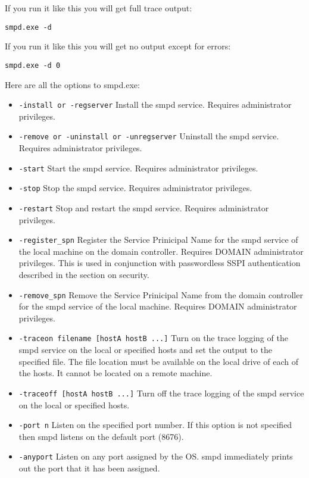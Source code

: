 \documentclass[dvipdfm,11pt]{article}
\begin{document}
If you run it like this you will get full trace output:
\begin{verbatim}
smpd.exe -d
\end{verbatim}

If you run it like this you will get no output except for errors:
\begin{verbatim}
smpd.exe -d 0
\end{verbatim}

Here are all the options to smpd.exe:
\begin{itemize}
\item \texttt{-install or -regserver}
Install the smpd service.  Requires administrator privileges.
\item \texttt{-remove or -uninstall or -unregserver}
Uninstall the smpd service.  Requires administrator privileges.
\item \texttt{-start}
Start the smpd service.  Requires administrator privileges.
\item \texttt{-stop}
Stop the smpd service.  Requires administrator privileges.
\item \texttt{-restart}
Stop and restart the smpd service.  Requires administrator privileges.
\item \texttt{-register\_spn}
Register the Service Prinicipal Name for the smpd service of the local machine
on the domain controller.  Requires DOMAIN administrator privileges.  This is
used in conjunction with passwordless SSPI authentication described in the
section on security.
\item \texttt{-remove\_spn}
Remove the Service Prinicipal Name from the domain controller for the smpd service
of the local machine.  Requires DOMAIN administrator privileges.
\item \texttt{-traceon filename [hostA hostB ...]}
Turn on the trace logging of the smpd service on the local or specified hosts
and set the output to the specified file.  The file location must be available
on the local drive of each of the hosts.  It cannot be located on a remote 
machine.
\item \texttt{-traceoff [hostA hostB ...]}
Turn off the trace logging of the smpd service on the local or specified hosts.
\item \texttt{-port n}
Listen on the specified port number.  If this option is not specified then smpd
listens on the default port (8676).
\item \texttt{-anyport}
Listen on any port assigned by the OS.  smpd immediately prints out the port that
it has been assigned.

\end{itemize}
\end{document}

